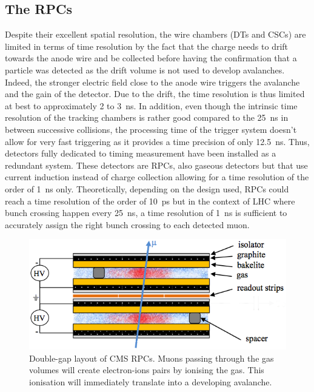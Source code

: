 	\subsection{The \acl{RPC}s}
	\label{chapt3:ssec:RPCs}
	
	Despite their excellent spatial resolution, the wire chambers (DTs and CSCs) are limited in terms of time resolution by the fact that the charge needs to drift towards the anode wire and be collected before having the confirmation that a particle was detected as the drift volume is not used to develop avalanches. Indeed, the stronger electric field close to the anode wire triggers the avalanche and the gain of the detector. Due to the drift, the time resolution is thus limited at best to approximately 2 to \SI{3}{ns}. In addition, even though the intrinsic time resolution of the tracking chambers is rather good compared to the \SI{25}{ns} in between successive collisions, the processing time of the trigger system doesn't allow for very fast triggering as it provides a time precision of only \SI{12.5}{ns}. Thus, detectors fully dedicated to timing measurement have been installed as a redundant system. These detectors are RPCs, also gaseous detectors but that use current induction instead of charge collection allowing for a time resolution of the order of \SI{1}{ns} only. Theoretically, depending on the design used, RPCs could reach a time resolution of the order of \SI{10}{ps} but in the context of LHC where bunch crossing happen every \SI{25}{ns}, a time resolution of \SI{1}{ns} is sufficient to accurately assign the right bunch crossing to each detected muon.
	
\begingroup\setlength{\intextsep}{5pt}\setlength{\columnsep}{15pt}

	\begin{figure}
		\centering
		\includegraphics[width=\linewidth]{fig/chapt3/RPC_DG_layout.png}
		\caption{\label{fig:RPC-DG-layout} Double-gap layout of CMS RPCs. Muons passing through the gas volumes will create electron-ions pairs by ionising the gas. This ionisation will immediately translate into a developing avalanche.}
	\end{figure}
	
